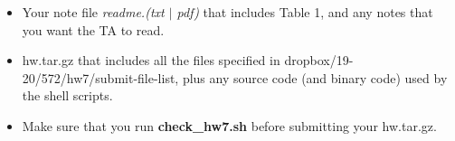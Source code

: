 \documentclass[11pt]{article}
\begin{document}
\begin{itemize}
    \item Your note file {\it readme.(txt $\mid$ pdf)}
    that includes Table 1, and any notes that you want the TA to read.
      

  \item  hw.tar.gz that includes all the files specified in
      dropbox/19-20/572/hw7/submit-file-list, plus any source code
      (and binary code) used by the shell scripts.

  \item Make sure that you run {\bf check\_hw7.sh} before
    submitting your hw.tar.gz.
    

  
  

\end{itemize}
\end{document}

